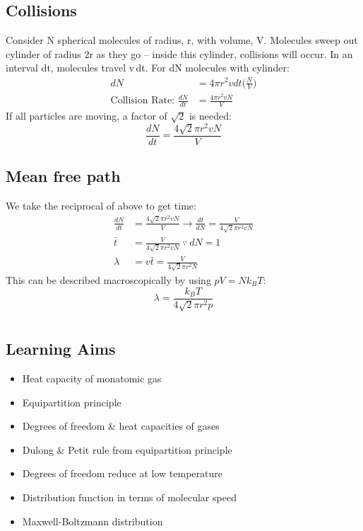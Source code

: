 \documentclass[a4paper, 11pt, normalem]{report}
\begin{document}
\section{Collisions}
Consider N spherical molecules of radius, r, with volume, V.
Molecules sweep out cylinder of radius 2r as they go -- inside this cylinder, collisions will occur.
In an interval dt, molecules travel v{\,}dt.
For dN molecules with cylinder:
\begin{align}
    dN &= 4{\pi}r^{2}vdt\Big(\frac{N}{V}\Big) \\
    \text{Collision Rate: } \frac{dN}{dt} &= \frac{4{\pi}r^{2}vN}{V}
\end{align}
If all particles are moving, a factor of $\sqrt{2}$ is needed:
\begin{equation}
	\frac{dN}{dt} = \frac{4\sqrt{2}{\pi}r^{2}vN}{V}
\end{equation}

\section{Mean free path}
We take the reciprocal of above to get time:
\begin{align}
    \frac{dN}{dt} &= \frac{4\sqrt{2}{\pi}r^{2}vN}{V} \rightarrow \frac{dt}{dN} = \frac{V}{4\sqrt{2}{\pi}r^{2}vN} \\
    \bar{t} &= \frac{V}{4\sqrt{2}{\pi}r^{2}vN} ~\because~ dN = 1 \\
    \lambda &= v\bar{t} = \frac{V}{4\sqrt{2}{\pi}r^{2}N}
\end{align}
This can be described macroscopically by using $pV = Nk_{B}T$:
\begin{equation}
	\lambda = \frac{k_{B}T}{4\sqrt{2}{\pi}r^{2}p}
\end{equation}

\chapter{}
\section{Learning Aims}
\begin{itemize}
	\item Heat capacity of monatomic gas
	\item Equipartition principle
	\item Degrees of freedom \& heat capacities of gases
	\item Dulong \& Petit rule from equipartition principle
	\item Degrees of freedom reduce at low temperature
	\item Distribution function in terms of molecular speed
	\item Maxwell-Boltzmann distribution
\end{itemize}
\end{document}
